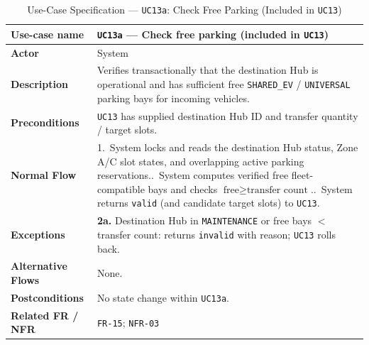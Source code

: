 \begin{table}[H]
  \centering
  \singlespacing\footnotesize
  \caption{Use-Case Specification --- \texttt{UC13a}: Check Free Parking (Included in \texttt{UC13})}
  \label{tab:uc13a}
  \renewcommand{\arraystretch}{1.13}
  \begin{tabularx}{\textwidth}{|L{2.9cm}|Y|}
    \hline
    \textbf{Use-case name} & \textbf{\texttt{UC13a} --- Check free parking (included in \texttt{UC13})} \\
    \hline
    \textbf{Actor} & System \\
    \hline
    \textbf{Description} & Verifies transactionally that the destination Hub is operational and has sufficient free \texttt{SHARED\_\allowbreak EV} / \texttt{UNIVERSAL} parking bays for incoming vehicles. \\
    \hline
    \textbf{Preconditions} & \texttt{UC13} has supplied destination Hub ID and transfer quantity / target slots. \\
    \hline
    \textbf{Normal Flow} & 1.\ System locks and reads the destination Hub status, Zone A/C slot states, and overlapping active parking reservations..\ System computes verified free fleet-compatible bays and checks $\text{free} \ge \text{transfer count}$..\ System returns \texttt{valid} (and candidate target slots) to \texttt{UC13}. \\
    \hline
    \textbf{Exceptions} & \textbf{2a.} Destination Hub in \texttt{MAINTENANCE} or free bays $<$ transfer count: returns \texttt{invalid} with reason; \texttt{UC13} rolls back. \\
    \hline
    \textbf{Alternative Flows} & None. \\
    \hline
    \textbf{Postconditions} & No state change within \texttt{UC13a}. \\
    \hline
    \textbf{Related FR / NFR} & \texttt{FR-15}; \texttt{NFR-03} \\
    \hline
  \end{tabularx}
\end{table}

